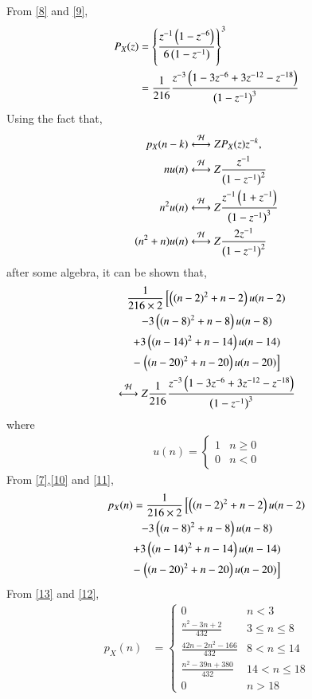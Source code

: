 From \eqref{8} and \eqref{9},
\begin{align}
    P_X{\brak{z}}&=\cbrak{\frac{z^{-1}\brak{1-z^{-6}}}{6\brak{1-z^{-1}}}}^3\\
    &= \frac{1}{216}\frac{z^{-3}\brak{1-3z^{-6}+3z^{-12}-z^{-18}}}{\brak{1-z^{-1}}^3}\label{10}
\end{align}
Using the fact that,
\begin{align}
p_X(n-k) &\overset{\mathcal{H}}{ \longleftrightarrow}{Z}P_X(z)z^{-k},
\\
nu(n)&\overset{\mathcal{H}}{ \longleftrightarrow}{Z} \frac{z^{-1}}{\left(1-z^{-1}\right)^2}\\
n^2u(n)&\overset{\mathcal{H}}{ \longleftrightarrow}{Z} \frac{z^{-1}\left(1+z^{-1}\right)}{\left(1-z^{-1}\right)^3}\\
(n^2+n)u(n)&\overset{\mathcal{H}}{ \longleftrightarrow}{Z} \frac{2z^{-1}}{\left(1-z^{-1}\right)^2}
\end{align}
after some algebra, it can be shown that,
\begin{multline}
\frac{1}{216\times 2}\lsbrak{\brak{(n-2)^2+n-2}u(n-2)} \\-3 \brak{(n-8)^2+n-8}u(n-8)\\+3\brak{(n-14)^2+n-14}u(n-14)\\-\rsbrak{\brak{(n-20)^2+n-20}u(n-20)}
\\
\system{Z}
\frac{1}{216}\frac{z^{-3}\brak{1-3z^{-6}+3z^{-12}-z^{-18}}}{\brak{1-z^{-1}}^3}
\label{11}
\end{multline}
where 
\begin{align}
u(n) =
\begin{cases}
1 & n \ge 0
\\
0 & n < 0\label{13}
\end{cases}
\end{align}
From \eqref{7},\eqref{10} and \eqref{11},
\begin{multline}
p_{X}(n) = \frac{1}{216\times 2}\lsbrak{\brak{(n-2)^2+n-2}u(n-2)} \\-3 \brak{(n-8)^2+n-8}u(n-8)\\+3\brak{(n-14)^2+n-14}u(n-14)\\-\rsbrak{\brak{(n-20)^2+n-20}u(n-20)}
\label{12}
\end{multline}
From \eqref{13} and \eqref{12},
\begin{align}
p_X(n) &= 
\begin{cases}
0 & n < 3\\
\frac{n^2-3n+2}{432} &  3 \le n \le  8\\
\frac{42n-2n^2-166}{432} & 8 < n \le 14\\
\frac{n^2-39n+380}{432} & 14 < n \le 18\\
0 & n > 18\label{14}
\end{cases}
\end{align}
